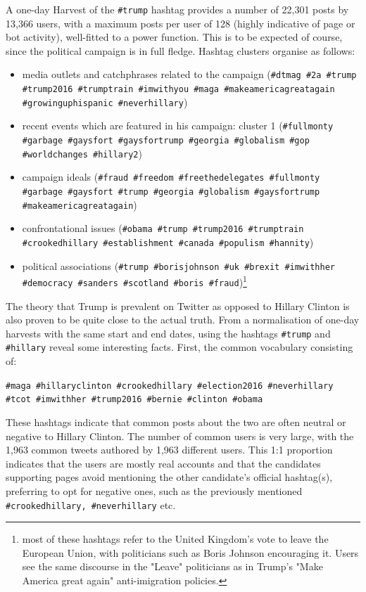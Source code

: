 \documentclass[12pt,a4paper,twoside]{report}
\begin{document}
A one-day Harvest of the \texttt{\#trump} hashtag provides a number of 22,301 posts by 13,366 users, with a maximum posts per user of 128 (highly indicative of page or bot activity), well-fitted to a power function. This is to be expected of course, since the political campaign is in full fledge. Hashtag clusters organise as follows:

\begin{itemize}
\item media outlets and catchphrases related to the campaign (\texttt{\#dtmag \#2a \#trump \#trump2016 \#trumptrain \#imwithyou \#maga \#makeamericagreatagain \#growinguphispanic \#neverhillary})
\item recent events which are featured in his campaign: cluster 1 (\texttt{\#fullmonty \#garbage \#gaysfort \#gaysfortrump \#georgia \#globalism \#gop \#worldchanges \#hillary2}) 
\item campaign ideals (\texttt{\#fraud \#freedom \#freethedelegates \#fullmonty \#garbage \#gaysfort \#trump \#georgia \#globalism \#gaysfortrump \#makeamericagreatagain})
\item confrontational issues (\texttt{\#obama \#trump \#trump2016 \#trumptrain \#crookedhillary \#establishment \#canada \#populism \#hannity})
\item political associations (\texttt{\#trump \#borisjohnson \#uk \#brexit \#imwithher \#democracy \#sanders \#scotland \#boris \#fraud})\footnote{most of these hashtags refer to the United Kingdom's vote to leave the European Union, with politicians such as Boris Johnson encouraging it. Users see the same discourse in the "Leave" politicians as in Trump's "Make America great again" anti-imigration policies.}
\end{itemize}

The theory that Trump is prevalent on Twitter as opposed to Hillary Clinton is also proven to be quite close to the actual truth. From a normalisation of one-day harvests with the same start and end dates, using the hashtags \texttt{\#trump} and \texttt{\#hillary} reveal some interesting facts. First, the common vocabulary consisting of:

\texttt{\#maga \#hillaryclinton \#crookedhillary \#election2016 \#neverhillary \#tcot \#imwithher \#trump2016 \#bernie \#clinton \#obama}

These hashtags indicate that common posts about the two are often neutral or negative to Hillary Clinton. The number of common users is very large, with the 1,963 common tweets authored by 1,963 different users. This 1:1 proportion indicates that the users are mostly real accounts and that the candidates supporting pages avoid mentioning the other candidate's official hashtag(s), preferring to opt for negative ones, such as the previously mentioned \texttt{\#crookedhillary, \#neverhillary} etc.
\end{document}
